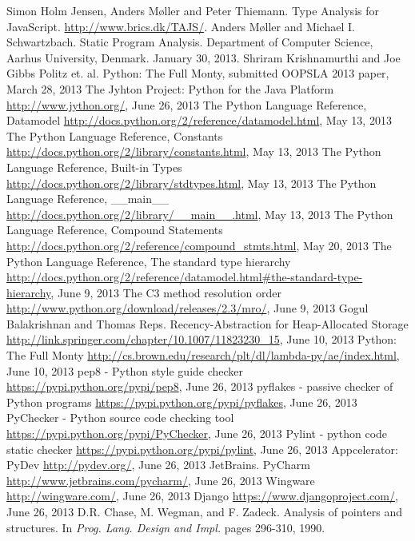 \begin{thebibliography}{8}

 Simon Holm Jensen, Anders M\o ller and Peter Thiemann. Type Analysis for JavaScript. \url{http://www.brics.dk/TAJS/}.
 Anders M\o ller and Michael I. Schwartzbach. Static Program Analysis. Department of Computer Science, Aarhus University, Denmark. January 30, 2013.
 Shriram Krishnamurthi and Joe Gibbs Politz et. al. Python: The Full Monty, submitted OOPSLA 2013 paper, March 28, 2013
 The Jyhton Project: Python for the Java Platform \url{http://www.jython.org/}, June 26, 2013
 The Python Language Reference, Datamodel \url{http://docs.python.org/2/reference/datamodel.html}, May 13, 2013
 The Python Language Reference, Constants \url{http://docs.python.org/2/library/constants.html}, May 13, 2013
 The Python Language Reference, Built-in Types \url{http://docs.python.org/2/library/stdtypes.html}, May 13, 2013
 The Python Language Reference, \_\_main\_\_ \url{http://docs.python.org/2/library/__main__.html}, May 13, 2013
 The Python Language Reference, Compound Statements \url{http://docs.python.org/2/reference/compound_stmts.html}, May 20, 2013
 The Python Language Reference, The standard type hierarchy \url{http://docs.python.org/2/reference/datamodel.html#the-standard-type-hierarchy}, June 9, 2013
 The C3 method resolution order \url{http://www.python.org/download/releases/2.3/mro/}, June 9, 2013
 Gogul Balakrishnan and Thomas Reps. Recency-Abstraction for Heap-Allocated Storage \url{http://link.springer.com/chapter/10.1007/11823230_15}, June 10, 2013
 Python: The Full Monty \url{http://cs.brown.edu/research/plt/dl/lambda-py/ae/index.html}, June 10, 2013
 pep8 - Python style guide checker \url{https://pypi.python.org/pypi/pep8}, June 26, 2013
 pyflakes - passive checker of Python programs \url{https://pypi.python.org/pypi/pyflakes}, June 26, 2013
 PyChecker - Python source code checking tool \url{https://pypi.python.org/pypi/PyChecker}, June 26, 2013
 Pylint - python code static checker \url{https://pypi.python.org/pypi/pylint}, June 26, 2013
 Appcelerator: PyDev \url{http://pydev.org/}, June 26, 2013
 JetBrains. PyCharm \url{http://www.jetbrains.com/pycharm/}, June 26, 2013
 Wingware \url{http://wingware.com/}, June 26, 2013
 Django \url{https://www.djangoproject.com/}, June 26, 2013
 D.R. Chase, M. Wegman, and F. Zadeck. Analysis of pointers and structures. In \textit{Prog. Lang. Design and Impl.} pages 296-310, 1990.
\end{thebibliography}